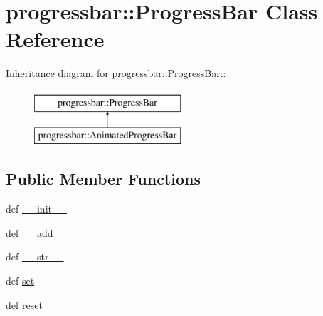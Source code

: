 \hypertarget{classprogressbar_1_1ProgressBar}{
\section{progressbar::ProgressBar Class Reference}
\label{classprogressbar_1_1ProgressBar}
}
Inheritance diagram for progressbar::ProgressBar::\begin{figure}[H]
\begin{center}
\leavevmode
\includegraphics[height=2cm]{classprogressbar_1_1ProgressBar}
\end{center}
\end{figure}
\subsection*{Public Member Functions}
\begin{DoxyCompactItemize}
\item 
def \hyperlink{classprogressbar_1_1ProgressBar_a7ad95b3ae7b580117dd48355a3e967ae}{\_\-\_\-init\_\-\_\-}
\item 
def \hyperlink{classprogressbar_1_1ProgressBar_a1f77ba8c29d99201812d6072c196c442}{\_\-\_\-add\_\-\_\-}
\item 
def \hyperlink{classprogressbar_1_1ProgressBar_ad7acb97d5893c7c67d9e1c8224364df9}{\_\-\_\-str\_\-\_\-}
\item 
def \hyperlink{classprogressbar_1_1ProgressBar_ad47beed6bd8b7239d0e8ce37966c96e6}{set}
\item 
def \hyperlink{classprogressbar_1_1ProgressBar_a1e3174a60591ce40f957310b350d62d4}{reset}
\end{DoxyCompactItemize}
